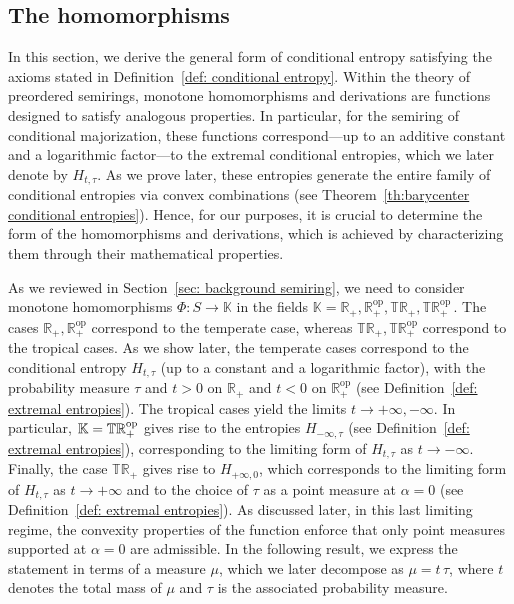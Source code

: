 \documentclass[aps,pra,11pt,onecolumn,nofootinbib,tightenlines]{revtex4-2}
\theoremstyle{definition}
\begin{document}
\subsection{The homomorphisms}
\label{sec: all monotone homorphisms}
In this section, we derive the general form of conditional entropy satisfying the axioms stated in Definition~\ref{def: conditional entropy}. Within the theory of preordered semirings, monotone homomorphisms and derivations are functions designed to satisfy analogous properties. In particular, for the semiring of conditional majorization, these functions correspond—up to an additive constant and a logarithmic factor—to the extremal conditional entropies, which we later denote by $H_{t,\tau}$. As we prove later, these entropies generate the entire family of conditional entropies via convex combinations (see Theorem~\ref{th:barycenter conditional entropies}). Hence, for our purposes, it is crucial to determine the form of the homomorphisms and derivations, which is achieved by characterizing them through their mathematical properties.



As we reviewed in Section~\ref{sec: background semiring}, we need to consider monotone homomorphisms \(\Phi: S \to \mathbb{K}\) in the fields $
    \mathbb{K} = \mathbb{R}_+,\mathbb{R}_+^{\mathrm{op}},\mathbb{TR}_+,\mathbb{TR}_+^{\mathrm{op}} \,.$
The cases $\mathbb{R}_+,\mathbb{R}_+^{\mathrm{op}}$ correspond to the temperate case, whereas $\mathbb{TR}_+,\mathbb{TR}_+^{\mathrm{op}} $ correspond to the tropical cases.
As we show later, the temperate cases correspond to the conditional entropy $H_{t,\tau}$ (up to a constant and a logarithmic factor), with the probability measure $\tau$ and $t>0$ on $\mathbb{R}_+$ and $t<0$ on $\mathbb{R}_+^{\mathrm{op}}$ (see Definition~\ref{def: extremal entropies}). The tropical cases yield the limits $t\to+\infty,-\infty$. In particular, $\mathbb{K} = \mathbb{TR}_+^{\rm op}$ gives rise to the entropies $H_{-\infty,\tau}$ (see Definition~\ref{def: extremal entropies}), corresponding to the limiting form of $H_{t,\tau}$ as $t\to-\infty$.
Finally, the case \(\mathbb{TR}_+\) gives rise to \(H_{+\infty,0}\), which corresponds to the limiting form of \(H_{t,\tau}\) as \(t \to +\infty\) and to the choice of \(\tau\) as a point measure at \(\alpha = 0\) (see Definition~\ref{def: extremal entropies}). As discussed later, in this last limiting regime, the convexity properties of the function enforce that only point measures supported at \(\alpha = 0\) are admissible. In the following result, we express the statement in terms of a measure \(\mu\), which we later decompose as \(\mu = t\,\tau\), where \(t\) denotes the total mass of \(\mu\) and \(\tau\) is the associated probability measure.
\end{document}
